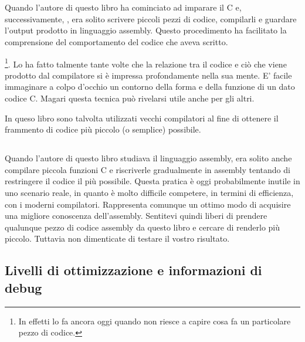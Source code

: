 \chapter{\ITAph{}}

Quando l'autore di questo libro ha cominciato ad imparare il C e, successivamente, \Cpp, era solito scrivere piccoli pezzi di codice, compilarli e guardare l'output prodotto in linguaggio assembly. Questo procedimento ha facilitato la comprensione del comportamento del codice che aveva scritto.

\footnote{In effetti lo fa ancora oggi quando non riesce a capire cosa fa un particolare pezzo di codice.}. 
Lo ha fatto talmente tante volte che la relazione tra il codice \CCpp e ciò che viene prodotto dal compilatore si è impressa profondamente nella sua mente. E' facile immaginare a colpo d'occhio un contorno della forma e della funzione di un dato codice C. 
Magari questa tecnica può rivelarsi utile anche per gli altri.


In queso libro sono talvolta utilizzati vecchi compilatori al fine di ottenere il frammento di codice più piccolo (o semplice) possibile.

\ifdefined\IncludeExercises
\section*{\Exercises}

Quando l'autore di questo libro studiava il linguaggio assembly, era solito anche compilare piccola funzioni C e riscriverle gradualmente in assembly tentando di restringere il codice il più possibile.
Questa pratica è oggi probabilmente inutile in uno scenario reale, in quanto è molto difficile competere, in termini di efficienza, con i moderni compilatori. Rappresenta comunque un ottimo modo di acquisire una migliore conoscenza dell'assembly.
Sentitevi quindi liberi di prendere qualunque pezzo di codice assembly da questo libro e cercare di renderlo più piccolo. Tuttavia non dimenticate di testare il vostro risultato.

\fi %

\section*{Livelli di ottimizzazione e informazioni di debug}

